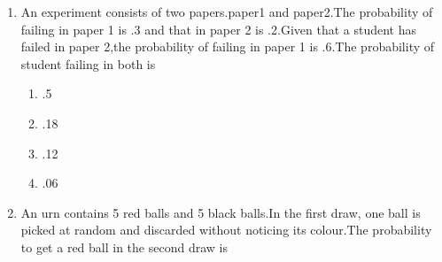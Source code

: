 \renewcommand{\theequation}{\theenumi}
\renewcommand{\thefigure}{\theenumi}
\renewcommand{\thetable}{\theenumi}
\begin{enumerate}[label=\thesection.\arabic*.,ref=\thesection.\theenumi]

\item An experiment consists of two papers.paper1 and paper2.The probability of failing in paper 1 is .3 and that in paper 2 is .2.Given that a student has failed in paper 2,the probability of failing in paper 1 is .6.The probability of student failing in both is\\
\begin{enumerate}
    \setlength\itemsep{2em}
\item .5 
\item .18 
\item .12 
\item .06 
\end{enumerate}
%
\solution

%
\item An urn contains 5 red balls and 5 black balls.In the first draw, one ball is picked at random and discarded without noticing its colour.The probability to get a red ball in the second draw is 
\begin{enumerate}
    \end{enumerate}    
%
\solution



\end{enumerate}
